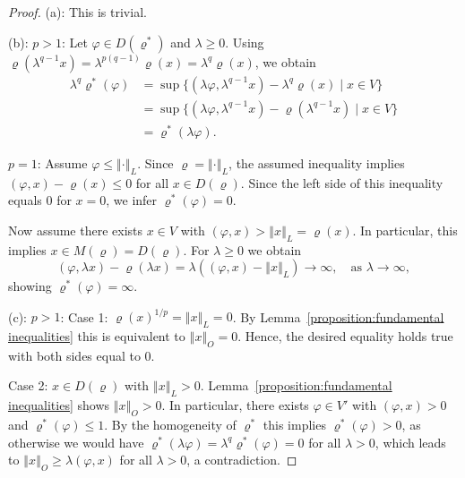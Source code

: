 \documentclass[a4paper,11pt,reqno]{amsart}
\theoremstyle{definition}
\numberwithin{equation}{section}
\newcommand{\vr}{{\varrho}}
\newcommand{\av}[1]{\left\Vert #1\right\Vert}
\newcommand{\1}{\mathds{1}}
\begin{document}
\begin{proof}
(a): This is trivial. 

(b): $p > 1$: Let $\varphi \in D(\vr^*)$ and $\lambda \geq 0$. Using $\vr(\lambda^{q-1} x) = \lambda^{p(q-1)} \vr(x) = \lambda^q \vr(x)$, we obtain 
 \begin{align*}
  \lambda^q \vr^*(\varphi) &= \sup \{(\lambda \varphi, \lambda^{q-1} x) - \lambda^q \vr(x) \mid x \in V\}\\
  &= \sup \{(\lambda \varphi, \lambda^{q-1} x) - \vr(\lambda^{q-1}x) \mid x \in V\}\\
  &= \vr^*(\lambda \varphi).
 \end{align*}

 $p = 1$: Assume $\varphi \leq \av{\cdot}_L$. Since $\vr = \av{\cdot}_L$, the  assumed inequality implies $(\varphi,x) - \vr(x) \leq 0$ for all $x \in D(\vr)$. Since the left side of this inequality equals $0$ for $x = 0$, we infer $\vr^*(\varphi) = 0$. 
 
 Now assume there exists $x \in V$ with $(\varphi,x) > \av{x}_L = \vr(x)$. In particular, this implies $x \in M(\vr) = D(\vr)$. For $\lambda \geq 0$ we obtain 
 $$(\varphi,\lambda x) - \vr(\lambda x) = \lambda ((\varphi,x) - \av{x}_L) \to \infty, \quad \text{as } \lambda \to \infty, $$
 showing $\vr^*(\varphi) = \infty$. 
 
(c): $p > 1$: Case 1: $\vr(x)^{1/p} = \av{x}_L = 0$. By Lemma~\ref{proposition:fundamental inequalities} this is equivalent to $\av{x}_O = 0$. Hence, the desired equality holds true with both sides equal to $0$. 

Case 2:  $x \in D(\vr)$ with $\av{x}_L > 0$. Lemma~\ref{proposition:fundamental inequalities} shows $\av{x}_O > 0$. In particular,  there exists $\varphi \in V'$ with $(\varphi,x) > 0$ and $\vr^*(\varphi) \leq 1$. By the homogeneity of $\vr^*$ this implies $\vr^*(\varphi) > 0$, as otherwise we would have $\vr^*(\lambda \varphi) = \lambda^q \vr^*(\varphi) = 0$ for all $\lambda > 0$, which leads to $\av{x}_O  \geq \lambda (\varphi,x)$ for all $\lambda > 0$, a contradiction. 


\end{proof}
\end{document}
